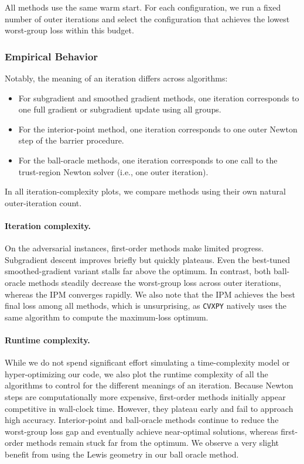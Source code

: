 All methods use the same warm start. For each configuration, we run a fixed number of outer iterations and select the configuration that achieves the lowest worst-group loss within this budget.

\subsubsection{Empirical Behavior}

Notably, the meaning of an iteration differs across algorithms:

\begin{itemize}
    \item For subgradient and smoothed gradient methods, one iteration corresponds to one full gradient or subgradient update using all groups.
    \item For the interior-point method, one iteration corresponds to one outer Newton step of the barrier procedure.
    \item For the ball-oracle methods, one iteration corresponds to one call to the trust-region Newton solver (i.e., one outer iteration).
\end{itemize}

In all iteration-complexity plots, we compare methods using their own natural outer-iteration count.

\paragraph{Iteration complexity.}
On the adversarial instances, first-order methods make limited progress. Subgradient descent improves briefly but quickly plateaus. Even the best-tuned smoothed-gradient variant stalls far above the optimum. In contrast, both ball-oracle methods steadily decrease the worst-group loss across outer iterations, whereas the IPM converges rapidly. We also note that the IPM achieves the best final loss among all methods, which is unsurprising, as \texttt{CVXPY} natively uses the same algorithm to compute the maximum-loss optimum.

\paragraph{Runtime complexity.} While we do not spend significant effort simulating a time-complexity model or hyper-optimizing our code, we also plot the runtime complexity of all the algorithms to control for the different meanings of an iteration. Because Newton steps are computationally more expensive, first-order methods initially appear competitive in wall-clock time. However, they plateau early and fail to approach high accuracy. Interior-point and ball-oracle methods continue to reduce the worst-group loss gap and eventually achieve near-optimal solutions, whereas first-order methods remain stuck far from the optimum. We observe a very slight benefit from using the Lewis geometry in our ball oracle method. 

